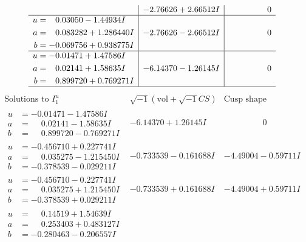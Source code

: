 \documentclass[1p]{elsarticle_modified}
\theoremstyle{definition}
\newcommand{\I}{\sqrt{-1}}
\begin{document}
$$\begin{array}{c|c|c}
 & -2.76626 + 2.66512 I & \phantom{-0.000000 } 0 \\ \hline\begin{aligned}
u &= \phantom{-}0.03050 - 1.44934 I \\
a &= \phantom{-}0.083282 + 1.286440 I \\
b &= -0.069756 + 0.938775 I\end{aligned}
 & -2.76626 - 2.66512 I & \phantom{-0.000000 } 0 \\ \hline\begin{aligned}
u &= -0.01471 + 1.47586 I \\
a &= \phantom{-}0.02141 + 1.58635 I \\
b &= \phantom{-}0.899720 + 0.769271 I\end{aligned}
 & -6.14370 - 1.26145 I & \phantom{-0.000000 } 0\\
 \hline 
 \end{array}$$\newpage$$\begin{array}{c|c|c}  
\text{Solutions to }I^u_{1}& \I (\text{vol} + \sqrt{-1}CS) & \text{Cusp shape}\\
 \hline 
\begin{aligned}
u &= -0.01471 - 1.47586 I \\
a &= \phantom{-}0.02141 - 1.58635 I \\
b &= \phantom{-}0.899720 - 0.769271 I\end{aligned}
 & -6.14370 + 1.26145 I & \phantom{-0.000000 } 0 \\ \hline\begin{aligned}
u &= -0.456710 + 0.227741 I \\
a &= \phantom{-}0.035275 - 1.215450 I \\
b &= -0.378539 - 0.029211 I\end{aligned}
 & -0.733539 - 0.161688 I & -4.49004 - 0.59711 I \\ \hline\begin{aligned}
u &= -0.456710 - 0.227741 I \\
a &= \phantom{-}0.035275 + 1.215450 I \\
b &= -0.378539 + 0.029211 I\end{aligned}
 & -0.733539 + 0.161688 I & -4.49004 + 0.59711 I \\ \hline\begin{aligned}
u &= \phantom{-}0.14519 + 1.54639 I \\
a &= \phantom{-}0.253403 + 0.483127 I \\
b &= -0.280463 - 0.206557 I\end{aligned}

\end{array}$$
\end{document}
